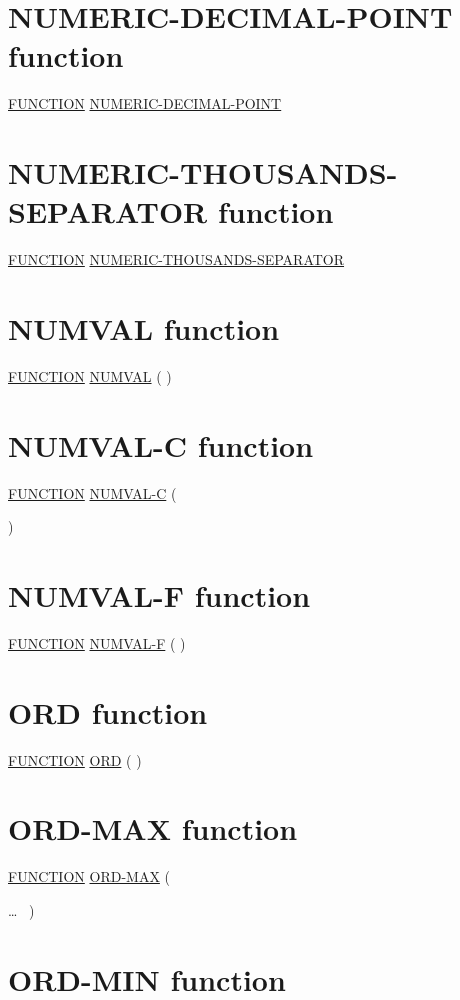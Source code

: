 \documentclass[a4paper,oneside,svgnames]{scrbook}
\makeatletter
\newcommand{\key}[1]{\underline{#1}}
\newcommand{\gnucobol}[1]{%
  \colorbox{orange!75}{#1}}
\newenvironment{0-1}{$\left[ \begin{tabular}{@{}l@{}}}{\end{tabular} \right]$}
\newenvironment{1=}{$\left\{ \begin{tabular}{@{}l@{}}}{\end{tabular} \right\}$}
\makeatother
\begin{document}
\section{NUMERIC-DECIMAL-POINT function}

\gnucobol{
  \key{FUNCTION} \key{NUMERIC-DECIMAL-POINT}
}

\section{NUMERIC-THOUSANDS-SEPARATOR function}

\gnucobol{
  \key{FUNCTION} \key{NUMERIC-THOUSANDS-SEPARATOR}
}

\section{NUMVAL function}

\key{FUNCTION} \key{NUMVAL} ( \argument )

\section{NUMVAL-C function}

\key{FUNCTION} \key{NUMVAL-C} ( \argument
\begin{0-1}
  \argument
\end{0-1}
)

\section{NUMVAL-F function}

\key{FUNCTION} \key{NUMVAL-F} ( \argument )

\section{ORD function}

\key{FUNCTION} \key{ORD} ( \argument )

\section{ORD-MAX function}

\key{FUNCTION} \key{ORD-MAX} (
\begin{1=}
  \argument
\end{1=} \ldots
\ {})

\section{ORD-MIN function}
\end{document}
